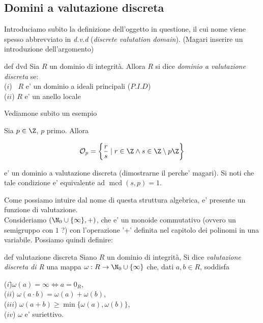 \subsection{Domini a valutazione discreta}

Introduciamo subito la definizione dell'oggetto in questione, il cui nome viene spesso abbrevviato in 
\emph{d.v.d} (\emph{discrete valutation domain}).
(Magari inserire un introduzione dell'argomento)

\begin{defn}{def dvd}
  Sia $R$ un dominio di integrità. Allora $R$ si dice \emph{dominio a valutazione discreta} se: \\
  \noindent ($i$) \ $R$ e' un dominio a ideali principali ($P.I.D$) \\
  \noindent ($ii$) $R$ e' un anello locale
\end{defn}

\noindent Vediamone subito un esempio

\begin{exm}
  Sia $p\in \Z$, $p$ primo. Allora 

  \[ \mathcal{O}_p = \bigg\{ \frac{r}{s} \mid r \in \Z \land s \in \Z \setminus p\Z \bigg\} \]

  \noindent e' un dominio a valutazione discreta (dimostrarne il perche' magari). Si noti che tale condizione
  e' equivalente ad $\operatorname{mcd}(s, p) = 1$.
\end{exm}

\noindent Come possiamo intuire dal nome di questa struttura algebrica, e' presente un funzione di valutazione. \\
\noindent Consideriamo $(\N_0 \cup \{\infty\}, +)$, che e' un monoide commutativo (ovvero un semigruppo con $1$ ?) con
l'operazione '+' definita nel capitolo dei polinomi in una variabile. Possiamo quindi definire:

\begin{defn}{def valutazione discreta}
  Siano $R$ un dominio di integrità, Si dice \emph{valutazione discreta di R} una mappa $\omega : R \rightarrow \N_0 \cup \{\infty\}$ che, 
  dati $a,b \in R$, soddisfa
  \begin{tabbing}
      ($i$)\quad\quad \=$\omega(a) = \infty \iff a = 0_R$, \\
      ($ii$)     \>$\omega(a\cdot b) = \omega(a) + \omega(b)$, \\
      ($iii$)    \>$\omega(a+b) \geq \min\{ \omega(a), \omega(b) \}$, \\
      ($iv$)     \>$\omega$ e' suriettivo.
  \end{tabbing}
\end{defn}

